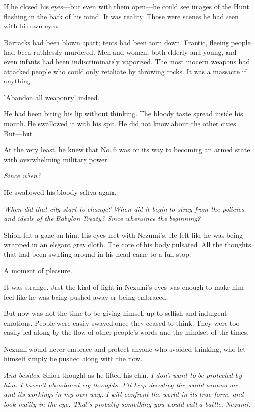 If he closed his eyes---but even with them open---he could see images of the
Hunt flashing in the back of his mind. It was reality. Those were scenes
he had seen with his own eyes.

Barracks had been blown apart; tents had been torn down. Frantic,
fleeing people had been ruthlessly murdered. Men and women, both elderly
and young, and even infants had been indiscriminately vaporized. The
most modern weapons had attacked people who could only retaliate by
throwing rocks. It was a massacre if anything.

'Abandon all weaponry' indeed.

He had been biting his lip without thinking. The bloody taste spread
inside his mouth. He swallowed it with his spit. He did not know about
the other cities. But---but\el 

At the very least, he knew that No. 6 was on its way to becoming an
armed state with overwhelming military power.

\emph{Since when?}

He swallowed his bloody saliva again.

\emph{When did that city start to change? When did it begin to stray
from the policies and ideals of the Babylon Treaty? Since when\el since
the beginning?}

\mybreak

Shion felt a gaze on him. His eyes met with Nezumi's. He felt like he
was being wrapped in an elegant grey cloth. The core of his body
pulsated. All the thoughts that had been swirling around in his head
came to a full stop.

A moment of pleasure.

It was strange. Just the kind of light in Nezumi's eyes was enough to
make him feel like he was being pushed away or being embraced.

But now was not the time to be giving himself up to selfish and
indulgent emotions. People were easily swayed once they ceased to think.
They were too easily led along by the flow of other people's words and
the mindset of the times.

Nezumi would never embrace and protect anyone who avoided thinking, who
let himself simply be pushed along with the flow.

\emph{And besides}, Shion thought as he lifted his chin. \emph{I don't want to be
protected by him. I haven't abandoned my thoughts. I'll keep decoding
the world around me and its workings in my own way. I will confront the
world in its true form, and look reality in the eye. That's probably
something you would call a battle, Nezumi.}

